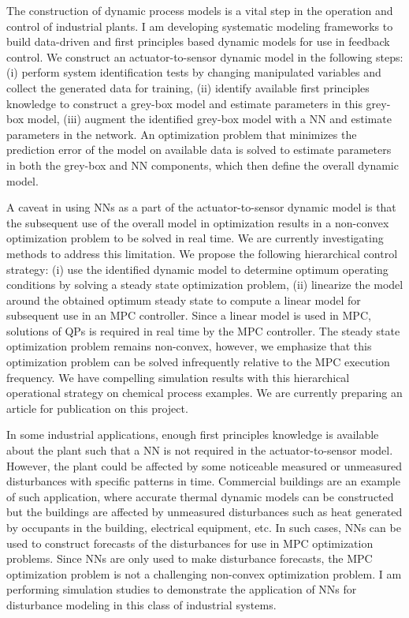 \documentclass[11pt, a4paper]{article} %
\begin{document}
The construction of dynamic process models is a vital step in the operation and control of industrial plants. I am developing systematic modeling frameworks to build data-driven and first principles based dynamic models for use in feedback control. We construct an actuator-to-sensor dynamic model in the following steps: (i) perform system identification tests by changing manipulated variables and collect the generated data for training, (ii) identify available first principles knowledge to construct a grey-box model and estimate parameters in this grey-box model, (iii) augment the identified grey-box model with a NN and estimate parameters in the network. An optimization problem that minimizes the prediction error of the model on available data is solved to estimate parameters in both the grey-box and NN components, which then define the overall dynamic model.

A caveat in using NNs as a part of the actuator-to-sensor dynamic model is that the subsequent use of the overall model in optimization results in a non-convex optimization problem to be solved in real time. We are currently investigating methods to address this limitation. We propose the following hierarchical control strategy: (i) use the identified dynamic model to determine optimum operating conditions by solving a steady state optimization problem, (ii) linearize the model around the obtained optimum steady state to compute a linear model for subsequent use in an MPC controller. Since a linear model is used in  MPC, solutions of QPs is required in real time by the MPC controller. The steady state optimization problem remains non-convex, however, we emphasize that this optimization problem can be solved infrequently relative to the MPC execution frequency. We have compelling simulation results with this hierarchical operational strategy on chemical process examples. We are currently preparing an article for publication on this project.

In some industrial applications, enough first principles knowledge is available about the plant such that a NN is not required in the actuator-to-sensor model. However, the plant could be affected by some noticeable measured or unmeasured disturbances with specific patterns in time. Commercial buildings are an example of such application, where accurate thermal dynamic models can be constructed but the buildings are affected by unmeasured disturbances such as heat generated by occupants in the building, electrical equipment, etc. In such cases, NNs can be used to construct forecasts of the disturbances for use in MPC optimization problems. Since NNs are only used to make disturbance forecasts, the MPC optimization problem is not a challenging non-convex optimization problem. I am performing simulation studies to demonstrate the application of NNs for disturbance modeling in this class of industrial systems.
\end{document}

